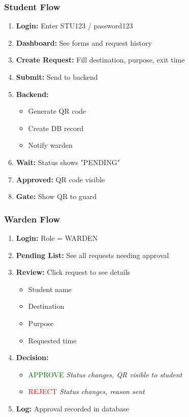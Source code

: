 \documentclass[11pt]{beamer}
\begin{document}
\begin{frame}
\frametitle{Student Flow}
\begin{enumerate}
    \item \textbf{Login:} Enter STU123 / password123
    \item \textbf{Dashboard:} See forms and request history
    \item \textbf{Create Request:} Fill destination, purpose, exit time
    \item \textbf{Submit:} Send to backend
    \item \textbf{Backend:}
    \begin{itemize}
        \item Generate QR code
        \item Create DB record
        \item Notify warden
    \end{itemize}
    \item \textbf{Wait:} Status shows "PENDING"
    \item \textbf{Approved:} QR code visible
    \item \textbf{Gate:} Show QR to guard
\end{enumerate}
\end{frame}

\begin{frame}
\frametitle{Warden Flow}
\begin{enumerate}
    \item \textbf{Login:} Role = WARDEN
    \item \textbf{Pending List:} See all requests needing approval
    \item \textbf{Review:} Click request to see details
    \begin{itemize}
        \item Student name
        \item Destination
        \item Purpose
        \item Requested time
    \end{itemize}
    \item \textbf{Decision:}
    \begin{itemize}
        \item \textcolor{darkgreen}{APPROVE} \textit{Status changes, QR visible to student}
        \item \textcolor{red}{REJECT} \textit{Status changes, reason sent}
    \end{itemize}
    \item \textbf{Log:} Approval recorded in database
\end{enumerate}
\end{frame}
\end{document}
